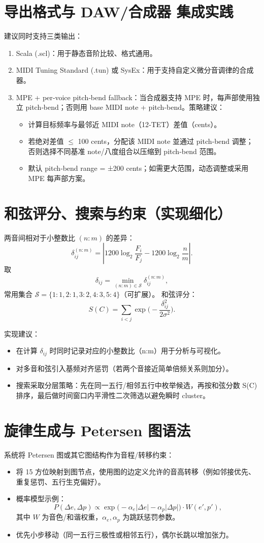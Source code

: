 \documentclass{article}
\begin{document}
\section{导出格式与 DAW/合成器 集成实践}
建议同时支持三类输出：
\begin{enumerate}
  \item Scala (.scl)：用于静态音阶比较、格式通用。
  \item MIDI Tuning Standard (.tun) 或 SysEx：用于支持自定义微分音调律的合成器。
  \item MPE + per‑voice pitch‑bend fallback：当合成器支持 MPE 时，每声部使用独立 pitch‑bend；否则用 base MIDI note + pitch‑bend。策略建议：
    \begin{itemize}
      \item 计算目标频率与最邻近 MIDI note（12‑TET）差值（cents）。
      \item 若绝对差值 $\le$ 100 cents，分配该 MIDI note 並通过 pitch‑bend 调整；否则选择不同基准 note/八度组合以压缩到 pitch‑bend 范围。
      \item 默认 pitch‑bend range = ±200 cents；如需更大范围，动态调整或采用 MPE 每声部方案。
    \end{itemize}
\end{enumerate}

\section{和弦评分、搜索与约束（实现细化）}
两音间相对于小整数比 $(n:m)$ 的差异：
\[
\delta_{ij}^{(n:m)}=\left|1200\log_2\frac{F_i}{F_j}-1200\log_2\frac{n}{m}\right|.
\]
取
\[
\delta_{ij}=\min_{(n:m)\in\mathcal{S}}\delta_{ij}^{(n:m)},
\]
常用集合 $\mathcal{S}=\{1:1,2:1,3:2,4:3,5:4\}$（可扩展）。
和弦评分：
\[
S(C)=\sum_{i<j}\exp\!\Big(-\frac{\delta_{ij}^2}{2\sigma^2}\Big).
\]

实现建议：
\begin{itemize}
  \item 在计算 $\delta_{ij}$ 时同时记录对应的小整数比（n:m）用于分析与可视化。
  \item 对多音和弦引入基频对齐惩罚（若两个音接近简单倍频关系则加分）。
  \item 搜索采取分层策略：先在同一五行/相邻五行中枚举候选，再按和弦分数 S(C) 排序，最后做时间窗口内平滑性二次筛选以避免瞬时 cluster。
\end{itemize}

\section{旋律生成与 Petersen 图语法}
系统将 Petersen 图或其它图结构作为音程/转移约束：
\begin{itemize}
  \item 将 15 方位映射到图节点，使用图的边定义允许的音高转移（例如邻接优先、重复惩罚、五行生克偏好）。
  \item 概率模型示例：
  \[
  P(\Delta e,\Delta p)\propto \exp\!\big(-\alpha_e|\Delta e|-\alpha_p|\Delta p|\big)\cdot W(e',p'),
  \]
  其中 $W$ 为音色/和谐权重，$\alpha_e,\alpha_p$ 为跳跃惩罚参数。
  \item 优先小步移动（同一五行三极性或相邻五行），偶尔长跳以增加张力。
\end{itemize}
\end{document}
